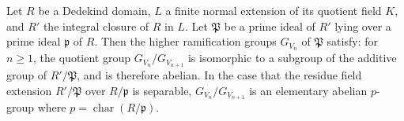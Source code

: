 Let $R$ be a Dedekind domain, $L$ a finite normal extension of its quotient field $K$, and $R'$ the integral closure of $R$ in $L$. Let $\mathfrak{P}$ be a prime ideal of $R'$ lying over a prime ideal $\mathfrak{p}$ of $R$. Then the higher ramification groups $G_{V_n}$ of $\mathfrak{P}$ satisfy: for $n \geq 1$, the quotient group $G_{V_n} / G_{V_{n+1}}$ is isomorphic to a subgroup of the additive group of $R'/\mathfrak{P}$, and is therefore abelian. In the case that the residue field extension $R'/\mathfrak{P}$ over $R/\mathfrak{p}$ is separable, $G_{V_n} / G_{V_{n+1}}$ is an elementary abelian $p$-group where $p = \operatorname{char}(R/\mathfrak{p})$.
